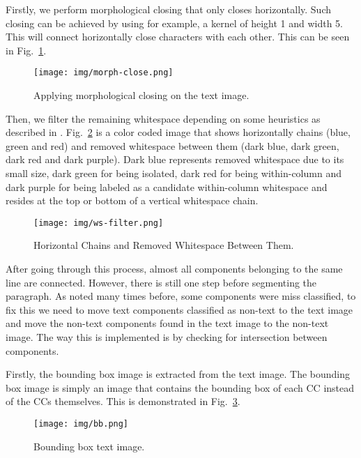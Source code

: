 \documentclass[conference]{IEEEtran}
\begin{document}
    Firstly, we perform morphological closing that only closes horizontally.
    Such closing can be achieved by using for example, a kernel of height 1 and width 5.
    This will connect horizontally close characters with each other.
    This can be seen in Fig.~\ref{img:morph-close-h}.
    
    \begin{figure}[htbp]
        \centerline{\texttt{[image: img/morph-close.png]}}
        \caption{Applying morphological closing on the text image.}
        \label{img:morph-close-h}
    \end{figure}
    
    Then, we filter the remaining whitespace depending on some heuristics as described in \cite{ws}.
    Fig.~\ref{img:ws-filter} is a color coded image that shows horizontally chains
    (blue, green and red) and removed whitespace between them
    (dark blue, dark green, dark red and dark purple).
    Dark blue represents removed whitespace due to its small size, dark green for being isolated,
    dark red for being within-column and dark purple for being labeled as a candidate within-column
    whitespace and resides at the top or bottom of a vertical whitespace chain.

    \begin{figure}[htbp]
        \centerline{\texttt{[image: img/ws-filter.png]}}
        \caption{Horizontal Chains and Removed Whitespace Between Them.}
        \label{img:ws-filter}
    \end{figure}

    After going through this process, almost all components belonging to the same line are connected.
    However, there is still one step before segmenting the paragraph.
    As noted many times before, some components were miss classified, to fix this we need to move text
    components classified as non-text to the text image and move the non-text components found in the
    text image to the non-text image.
    The way this is implemented is by checking for intersection between components.

    Firstly, the bounding box image is extracted from the text image.
    The bounding box image is simply an image that contains the bounding box of each CC instead of the CCs
    themselves. This is demonstrated in Fig.~\ref{img:bb}.

    \begin{figure}[htbp]
        \centerline{\texttt{[image: img/bb.png]}}
        \caption{Bounding box text image.}
        \label{img:bb}
    \end{figure}
\end{document}
